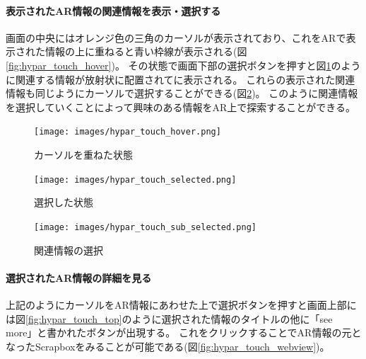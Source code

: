 \paragraph*{表示されたAR情報の関連情報を表示・選択する}
画面の中央にはオレンジ色の三角のカーソルが表示されており、これをARで表示された情報の上に重ねると青い枠線が表示される(図\ref{fig:hypar_touch_hover})。
その状態で画面下部の選択ボタンを押すと図\ref{fig:hypar_touch_selected}のように関連する情報が放射状に配置されてに表示される。
これらの表示された関連情報も同じようにカーソルで選択することができる(図\ref{fig:hypar_touch_sub_selected})。
このように関連情報を選択していくことによって興味のある情報をAR上で探索することができる。

\begin{figure}[H]
  \begin{minipage}{0.5\hsize}
    \centering
    \texttt{[image: images/hypar\_touch\_hover.png]}
    \caption{カーソルを重ねた状態} \label{fig:hypar_touch_hover}
  \end{minipage}
  \begin{minipage}{0.5\hsize}
    \centering
    \texttt{[image: images/hypar\_touch\_selected.png]}
    \caption{選択した状態} \label{fig:hypar_touch_selected}
  \end{minipage}
\end{figure}

\begin{figure}[H]
    \centering
    \texttt{[image: images/hypar\_touch\_sub\_selected.png]}
    \caption{関連情報の選択} \label{fig:hypar_touch_sub_selected}
\end{figure}


\paragraph*{選択されたAR情報の詳細を見る}
上記のようにカーソルをAR情報にあわせた上で選択ボタンを押すと画面上部には図\ref{fig:hypar_touch_top}のように選択された情報のタイトルの他に「see more」と書かれたボタンが出現する。
これをクリックすることでAR情報の元となったScrapboxをみることが可能である(図\ref{fig:hypar_touch_webview})。


